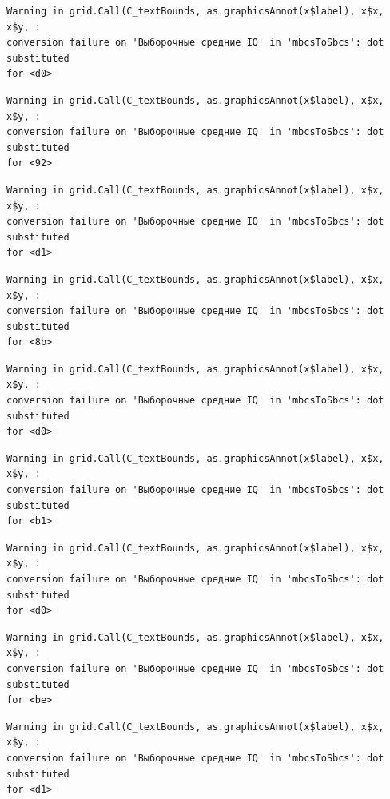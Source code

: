 \documentclass[
  letterpaper,
  DIV=11,
  numbers=noendperiod]{scrreprt}
\theoremstyle{definition}
\theoremstyle{remark}
\begin{document}
\begin{verbatim}
Warning in grid.Call(C_textBounds, as.graphicsAnnot(x$label), x$x, x$y, :
conversion failure on 'Выборочные средние IQ' in 'mbcsToSbcs': dot substituted
for <d0>
\end{verbatim}

\begin{verbatim}
Warning in grid.Call(C_textBounds, as.graphicsAnnot(x$label), x$x, x$y, :
conversion failure on 'Выборочные средние IQ' in 'mbcsToSbcs': dot substituted
for <92>
\end{verbatim}

\begin{verbatim}
Warning in grid.Call(C_textBounds, as.graphicsAnnot(x$label), x$x, x$y, :
conversion failure on 'Выборочные средние IQ' in 'mbcsToSbcs': dot substituted
for <d1>
\end{verbatim}

\begin{verbatim}
Warning in grid.Call(C_textBounds, as.graphicsAnnot(x$label), x$x, x$y, :
conversion failure on 'Выборочные средние IQ' in 'mbcsToSbcs': dot substituted
for <8b>
\end{verbatim}

\begin{verbatim}
Warning in grid.Call(C_textBounds, as.graphicsAnnot(x$label), x$x, x$y, :
conversion failure on 'Выборочные средние IQ' in 'mbcsToSbcs': dot substituted
for <d0>
\end{verbatim}

\begin{verbatim}
Warning in grid.Call(C_textBounds, as.graphicsAnnot(x$label), x$x, x$y, :
conversion failure on 'Выборочные средние IQ' in 'mbcsToSbcs': dot substituted
for <b1>
\end{verbatim}

\begin{verbatim}
Warning in grid.Call(C_textBounds, as.graphicsAnnot(x$label), x$x, x$y, :
conversion failure on 'Выборочные средние IQ' in 'mbcsToSbcs': dot substituted
for <d0>
\end{verbatim}

\begin{verbatim}
Warning in grid.Call(C_textBounds, as.graphicsAnnot(x$label), x$x, x$y, :
conversion failure on 'Выборочные средние IQ' in 'mbcsToSbcs': dot substituted
for <be>
\end{verbatim}

\begin{verbatim}
Warning in grid.Call(C_textBounds, as.graphicsAnnot(x$label), x$x, x$y, :
conversion failure on 'Выборочные средние IQ' in 'mbcsToSbcs': dot substituted
for <d1>
\end{verbatim}
\end{document}
